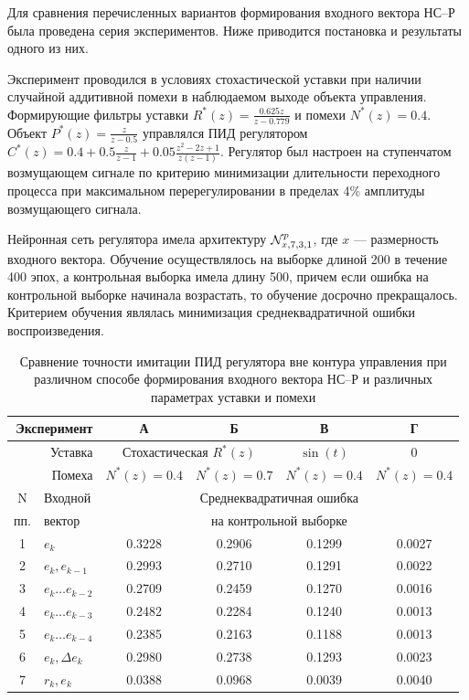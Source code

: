 Для сравнения перечисленных вариантов формирования входного вектора
НС--Р была проведена серия экспериментов.  Ниже приводится постановка
и результаты одного из них.

Эксперимент проводился в условиях стохастической уставки при наличии
случайной аддитивной помехи в наблюдаемом выходе объекта управления.
Формирующие фильтры уставки $R^*(z)=\frac{0.625z}{z-0.779}$ и помехи
$N^*(z)=0.4$.  Объект $P^*(z)=\frac{z}{z-0.5}$ управлялся ПИД
регулятором $C^*(z)=0.4 + 0.5\frac{z}{z-1} +
0.05\frac{z^2-2z+1}{z(z-1)}$.  Регулятор был настроен на ступенчатом
возмущающем сигнале по критерию минимизации длительности переходного
процесса при максимальном перерегулировании в пределах 4\% амплитуды
возмущающего сигнала.

Нейронная сеть регулятора имела архитектуру $\mathcal{N}^p_{x,7,3,1}$,
где $x$ --- размерность входного вектора.  Обучение осуществлялось на
выборке длиной 200 в течение 400 эпох, а контрольная выборка имела
длину 500, причем если ошибка на контрольной выборке начинала
возрастать, то обучение досрочно прекращалось.  Критерием обучения
являлась минимизация среднеквадратичной ошибки воспроизведения.

\begin{table}[ht]
\centering
\caption{Сравнение точности имитации ПИД регулятора вне контура управления
         при различном способе формирования входного вектора НС--Р и
         различных параметрах уставки и помехи}
\label{tabl:nnc_pretr_input_vec}
\begin{tabular}{|c|l|c|c|c|c|}
\hline
\multicolumn{2}{|r|}{Эксперимент} & {\sf А} & {\sf Б} & {\sf В} & {\sf Г}\\
\hline
\multicolumn{2}{|r|}{Уставка} &
  \multicolumn{2}{|c|}{Стохастическая $R^*(z)$} & $\sin(t)$ & $0$ \\
\hline
\multicolumn{2}{|r|}{Помеха} & $N^*(z)=0.4$ & $N^*(z)=0.7$ & $N^*(z)=0.4$ & $N^*(z)=0.4$\\
\hline\hline
N   & Входной & \multicolumn{4}{|c|}{Среднеквадратичная ошибка} \\
пп. & вектор  & \multicolumn{4}{|c|}{на контрольной выборке}\\
\hline
1 & $e_k$                 & 0.3228 & 0.2906 & 0.1299 & 0.0027\\
2 & $e_k,e_{k-1}$         & 0.2993 & 0.2710 & 0.1291 & 0.0022\\
3 & $e_k\ldots e_{k-2}$   & 0.2709 & 0.2459 & 0.1270 & 0.0016\\
4 & $e_k\ldots e_{k-3}$   & 0.2482 & 0.2284 & 0.1240 & 0.0013\\
5 & $e_k\ldots e_{k-4}$   & 0.2385 & 0.2163 & 0.1188 & 0.0013\\
6 & $e_k,\Delta e_k$      & 0.2980 & 0.2738 & 0.1293 & 0.0023\\
7 & $r_k,e_k$             & 0.0388 & 0.0968 & 0.0039 & 0.0040\\
\hline
\end{tabular}
\end{table}

